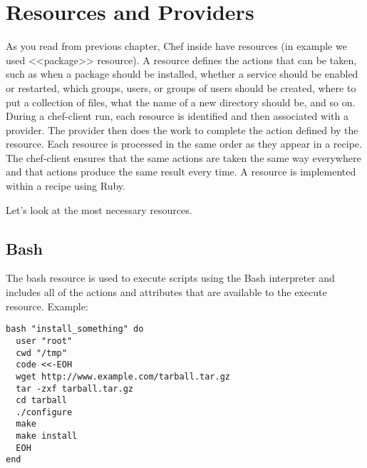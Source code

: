 \section{Resources and Providers}

As you read from previous chapter, Chef inside have resources (in example we used <<package>> resource). A resource defines the actions that can be taken, such as when a package should be installed, whether a service should be enabled or restarted, which groups, users, or groups of users should be created, where to put a collection of files, what the name of a new directory should be, and so on. During a chef-client run, each resource is identified and then associated with a provider. The provider then does the work to complete the action defined by the resource. Each resource is processed in the same order as they appear in a recipe. The chef-client ensures that the same actions are taken the same way everywhere and that actions produce the same result every time. A resource is implemented within a recipe using Ruby.

Let's look at the most necessary resources.

\subsection{Bash}

The bash resource is used to execute scripts using the Bash interpreter and includes all of the actions and attributes that are available to the execute resource. Example:

\begin{lstlisting}[label=lst:cookbook-resources-bash]
bash "install_something" do
  user "root"
  cwd "/tmp"
  code <<-EOH
  wget http://www.example.com/tarball.tar.gz
  tar -zxf tarball.tar.gz
  cd tarball
  ./configure
  make
  make install
  EOH
end
\end{lstlisting}